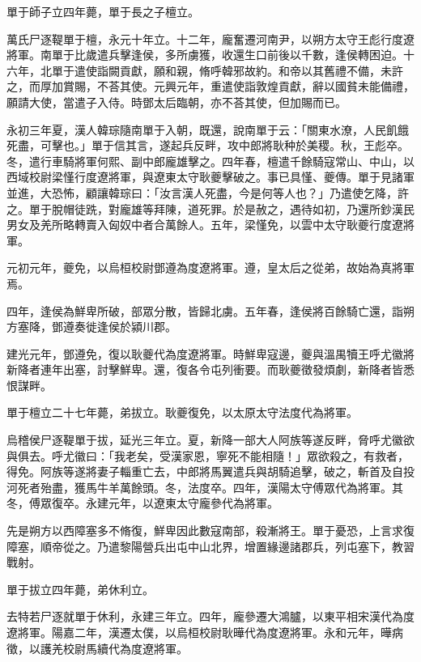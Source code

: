 \begin{pinyinscope}
單于師子立四年薨，單于長之子檀立。

萬氏尸逐鞮單于檀，永元十年立。十二年，龐奮遷河南尹，以朔方太守王彪行度遼將軍。南單于比歲遣兵擊逢侯，多所虜獲，收還生口前後以千數，逢侯轉困迫。十六年，北單于遣使詣闕貢獻，願和親，脩呼韓邪故約。和帝以其舊禮不備，未許之，而厚加賞賜，不荅其使。元興元年，重遣使詣敦煌貢獻，辭以國貧未能備禮，願請大使，當遣子入侍。時鄧太后臨朝，亦不荅其使，但加賜而已。

永初三年夏，漢人韓琮隨南單于入朝，既還，說南單于云：「關東水潦，人民飢餓死盡，可擊也。」單于信其言，遂起兵反畔，攻中郎將耿种於美稷。秋，王彪卒。冬，遣行車騎將軍何熙、副中郎龐雄擊之。四年春，檀遣千餘騎寇常山、中山，以西域校尉梁慬行度遼將軍，與遼東太守耿夔擊破之。事已具慬、夔傳。單于見諸軍並進，大恐怖，顧讓韓琮曰：「汝言漢人死盡，今是何等人也？」乃遣使乞降，許之。單于脫帽徒跣，對龐雄等拜陳，道死罪。於是赦之，遇待如初，乃還所鈔漢民男女及羌所略轉賣入匈奴中者合萬餘人。五年，梁慬免，以雲中太守耿夔行度遼將軍。

元初元年，夔免，以烏桓校尉鄧遵為度遼將軍。遵，皇太后之從弟，故始為真將軍焉。

四年，逢侯為鮮卑所破，部眾分散，皆歸北虜。五年春，逢侯將百餘騎亡還，詣朔方塞降，鄧遵奏徙逢侯於潁川郡。

建光元年，鄧遵免，復以耿夔代為度遼將軍。時鮮卑寇邊，夔與溫禺犢王呼尤徽將新降者連年出塞，討擊鮮卑。還，復各令屯列衝要。而耿夔徵發煩劇，新降者皆悉恨謀畔。

單于檀立二十七年薨，弟拔立。耿夔復免，以太原太守法度代為將軍。

烏稽侯尸逐鞮單于拔，延光三年立。夏，新降一部大人阿族等遂反畔，脅呼尤徽欲與俱去。呼尤徽曰：「我老矣，受漢家恩，寧死不能相隨！」眾欲殺之，有救者，得免。阿族等遂將妻子輜重亡去，中郎將馬翼遣兵與胡騎追擊，破之，斬首及自投河死者殆盡，獲馬牛羊萬餘頭。冬，法度卒。四年，漢陽太守傅眾代為將軍。其冬，傅眾復卒。永建元年，以遼東太守龐參代為將軍。

先是朔方以西障塞多不脩復，鮮卑因此數寇南部，殺漸將王。單于憂恐，上言求復障塞，順帝從之。乃遣黎陽營兵出屯中山北界，增置緣邊諸郡兵，列屯塞下，教習戰射。

單于拔立四年薨，弟休利立。

去特若尸逐就單于休利，永建三年立。四年，龐參遷大鴻臚，以東平相宋漢代為度遼將軍。陽嘉二年，漢遷太僕，以烏桓校尉耿曄代為度遼將軍。永和元年，曄病徵，以護羌校尉馬續代為度遼將軍。


\end{pinyinscope}

